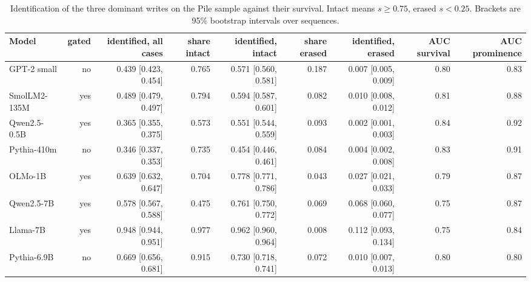 \begin{table}[H]\centering\scriptsize
\caption{Identification of the three dominant writes on the Pile sample against their survival. Intact means $s\ge0.75$, erased $s<0.25$. Brackets are 95\% bootstrap intervals over sequences.}\label{app:z3-surv-pile}
\begin{adjustbox}{max width=\linewidth}
\begin{tabular}{lrrrrrrrr}\toprule
Model & gated & identified, all cases & share intact & identified, intact & share erased & identified, erased & AUC survival & AUC prominence \\ \midrule
GPT-2 small & no & 0.439 [0.423, 0.454] & 0.765 & 0.571 [0.560, 0.581] & 0.187 & 0.007 [0.005, 0.009] & 0.80 & 0.83 \\
SmolLM2-135M & yes & 0.489 [0.479, 0.497] & 0.794 & 0.594 [0.587, 0.601] & 0.082 & 0.010 [0.008, 0.012] & 0.81 & 0.88 \\
Qwen2.5-0.5B & yes & 0.365 [0.355, 0.375] & 0.573 & 0.551 [0.544, 0.559] & 0.093 & 0.002 [0.001, 0.003] & 0.84 & 0.92 \\
Pythia-410m & no & 0.346 [0.337, 0.353] & 0.735 & 0.454 [0.446, 0.461] & 0.084 & 0.004 [0.002, 0.008] & 0.83 & 0.91 \\
OLMo-1B & yes & 0.639 [0.632, 0.647] & 0.704 & 0.778 [0.771, 0.786] & 0.043 & 0.027 [0.021, 0.033] & 0.79 & 0.87 \\
Qwen2.5-7B & yes & 0.578 [0.567, 0.588] & 0.475 & 0.761 [0.750, 0.772] & 0.069 & 0.068 [0.060, 0.077] & 0.75 & 0.87 \\
Llama-7B & yes & 0.948 [0.944, 0.951] & 0.977 & 0.962 [0.960, 0.964] & 0.008 & 0.112 [0.093, 0.134] & 0.75 & 0.84 \\
Pythia-6.9B & no & 0.669 [0.656, 0.681] & 0.915 & 0.730 [0.718, 0.741] & 0.072 & 0.010 [0.007, 0.013] & 0.80 & 0.80 \\
\bottomrule\end{tabular}\end{adjustbox}
\end{table}
